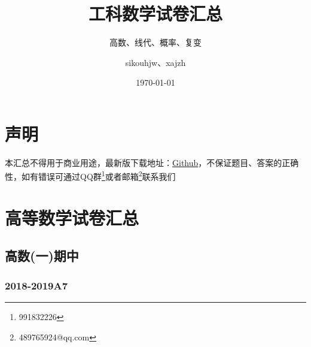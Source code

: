 \documentclass[cn,11pt,fancy,hide]{elegantbook}
\title{工科数学试卷汇总}
\subtitle{高数、线代、概率、复变}
\author{sikouhjw、xajzh}
\institute{临时组织起来的重排小组}
\date{\today}
\begin{document}
\maketitle
\tableofcontents


\mainmatter
\hypersetup{pageanchor=true}
\chapter{声明}
本汇总不得用于商业用途，最新版下载地址：\href{https://github.com/sikouhjw/LaTeX-learning-notes/tree/master/%E9%AB%98%E6%95%B0+%E7%BA%BF%E4%BB%A3+%E6%A6%82%E7%8E%87%E9%87%8D%E6%8E%92}{Github}，不保证题目、答案的正确性，如有错误可通过QQ群\footnote{991832226}或者邮箱\footnote{489765924@qq.com}联系我们

\chapter{高等数学试卷汇总}

\section{高数(一)期中}

\subsection{2018-2019A7}
\end{document}
